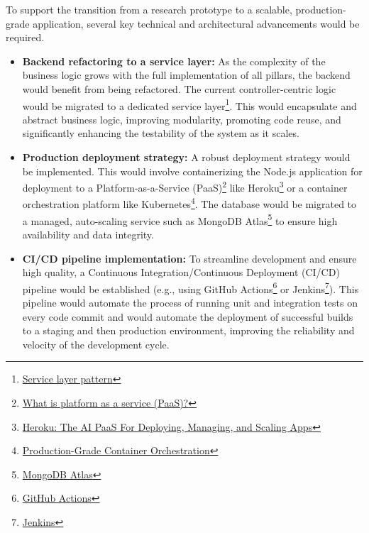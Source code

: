 To support the transition from a research prototype to a scalable, production-grade application, several key technical and architectural advancements would be required.

\begin{itemize}
\item \textbf{Backend refactoring to a service layer:} As the complexity of the business logic grows with the full implementation of all pillars, the backend would benefit from being refactored. The current controller-centric logic would be migrated to a dedicated service layer\footnote{\href{https://en.wikipedia.org/wiki/Service_layer_pattern}{Service layer pattern}}. This would encapsulate and abstract business logic, improving modularity, promoting code reuse, and significantly enhancing the testability of the system as it scales.
\textgap
\item \textbf{Production deployment strategy:} A robust deployment strategy would be implemented. This would involve containerizing the Node.js application for deployment to a Platform-as-a-Service (PaaS)\footnote{\href{https://azure.microsoft.com/en-us/resources/cloud-computing-dictionary/what-is-paas}{What is platform as a service (PaaS)?}} like Heroku\footnote{\href{https://www.heroku.com}{Heroku: The AI PaaS For Deploying, Managing, and Scaling Apps}} or a container orchestration platform like Kubernetes\footnote{\href{https://kubernetes.io}{Production-Grade Container Orchestration}}. The database would be migrated to a managed, auto-scaling service such as MongoDB Atlas\footnote{\href{https://www.mongodb.com/products/platform}{MongoDB Atlas}} to ensure high availability and data integrity.
\textgap
\item \textbf{CI/CD pipeline implementation:} To streamline development and ensure high quality, a Continuous Integration/Continuous Deployment (CI/CD) pipeline would be established (e.g., using GitHub Actions\footnote{\href{https://www.geeksforgeeks.org/git/github-actions/}{GitHub Actions}} or Jenkins\footnote{\href{https://www.jenkins.io}{Jenkins}}). This pipeline would automate the process of running unit and integration tests on every code commit and would automate the deployment of successful builds to a staging and then production environment, improving the reliability and velocity of the development cycle.
\end{itemize}
